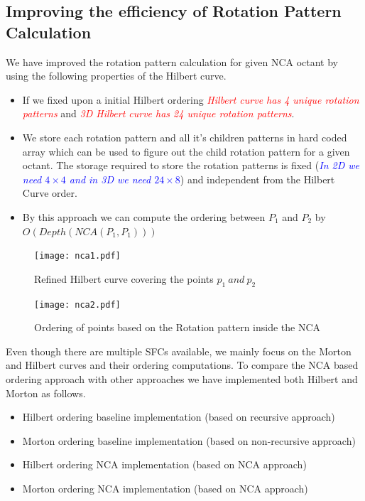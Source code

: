 \documentclass[a0,landscape]{a0poster}
\begin{document}
\begin{multicols}{4}
\subsection*{Improving the efficiency of Rotation Pattern Calculation}
We have improved the rotation pattern calculation for given NCA octant by using the following properties of the Hilbert curve.
\begin{itemize}
 \item If we fixed upon a initial Hilbert ordering \textit{\textcolor{red}{ Hilbert curve has 4 unique rotation patterns}} and \textit{\textcolor{red}{3D Hilbert curve has 24 unique rotation patterns}}.
 \item We store each rotation pattern and all it's children patterns in hard coded array which can be used to figure out the child rotation pattern for a given octant. The storage required to store the rotation patterns is fixed (\textit{\textcolor{blue}{In 2D we need $4\times4$  and in 3D we need $24\times8$}}) and independent from the Hilbert Curve order.
 \item By this approach we can compute the ordering between $P_1$ and $P_2$ by $O(Depth(NCA(P_1,P_1)))$
\end{itemize}





\begin{multicols}{2}
\begin{figure}[H]
\centering
\texttt{[image: nca1.pdf]}
\caption{Refined Hilbert curve covering the points $p_1\ and \ p_2$ \label{nca1}}
\end{figure}
\columnbreak

\begin{figure}[H]
\centering
\texttt{[image: nca2.pdf]}
\caption{Ordering of points based on the Rotation pattern inside the NCA \label{nca2}}
\end{figure}
\end{multicols}
 




Even though there are multiple SFCs available, we mainly focus on the Morton and Hilbert curves and their ordering computations. To compare the NCA based ordering approach with other approaches we have
implemented both Hilbert and Morton as follows.
\color{olive}
\begin{itemize}
 \item Hilbert ordering baseline implementation (based on recursive approach)
 \item Morton ordering baseline implementation (based on non-recursive approach)
 \item Hilbert ordering NCA implementation (based on NCA approach)
 \item Morton ordering NCA implementation (based on NCA approach)
\end{itemize}


\end{multicols}
\end{document}
